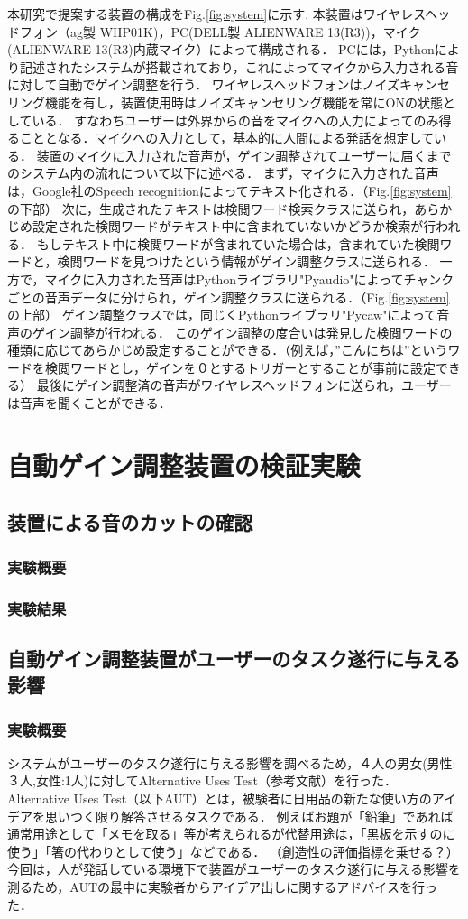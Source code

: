 \documentclass[a4paper]{jarticle}
\begin{document}
本研究で提案する装置の構成をFig.\ref{fig:system}に示す.
本装置はワイヤレスヘッドフォン（ag製 WHP01K)，PC(DELL製 ALIENWARE 13(R3))，マイク(ALIENWARE 13(R3)内蔵マイク）によって構成される．
PCには，Pythonにより記述されたシステムが搭載されており，これによってマイクから入力される音に対して自動でゲイン調整を行う．
ワイヤレスヘッドフォンはノイズキャンセリング機能を有し，装置使用時はノイズキャンセリング機能を常にONの状態としている．
すなわちユーザーは外界からの音をマイクへの入力によってのみ得ることとなる．マイクへの入力として，基本的に人間による発話を想定している．
装置のマイクに入力された音声が，ゲイン調整されてユーザーに届くまでのシステム内の流れについて以下に述べる．
まず，マイクに入力された音声は，Google社のSpeech recognitionによってテキスト化される．（Fig.\ref{fig:system}の下部）
次に，生成されたテキストは検閲ワード検索クラスに送られ，あらかじめ設定された検閲ワードがテキスト中に含まれていないかどうか検索が行われる．
もしテキスト中に検閲ワードが含まれていた場合は，含まれていた検閲ワードと，検閲ワードを見つけたという情報がゲイン調整クラスに送られる．
一方で，マイクに入力された音声はPythonライブラリ"Pyaudio"によってチャンクごとの音声データに分けられ，ゲイン調整クラスに送られる．（Fig.\ref{fig:system}の上部）
ゲイン調整クラスでは，同じくPythonライブラリ"Pycaw"によって音声のゲイン調整が行われる．
このゲイン調整の度合いは発見した検閲ワードの種類に応じてあらかじめ設定することができる．（例えば，”こんにちは”というワードを検閲ワードとし，ゲインを０とするトリガーとすることが事前に設定できる）
最後にゲイン調整済の音声がワイヤレスヘッドフォンに送られ，ユーザーは音声を聞くことができる．
\section{自動ゲイン調整装置の検証実験}
\subsection{装置による音のカットの確認}
\subsubsection{実験概要}
\subsubsection{実験結果}
\subsection{自動ゲイン調整装置がユーザーのタスク遂行に与える影響}
\subsubsection{実験概要}
システムがユーザーのタスク遂行に与える影響を調べるため，４人の男女(男性:３人,女性:1人)に対してAlternative Uses Test（参考文献）を行った．
Alternative Uses Test（以下AUT）とは，被験者に日用品の新たな使い方のアイデアを思いつく限り解答させるタスクである．
例えばお題が「鉛筆」であれば通常用途として「メモを取る」等が考えられるが代替用途は，「黒板を示すのに使う」「箸の代わりとして使う」などである．
（創造性の評価指標を乗せる？）
今回は，人が発話している環境下で装置がユーザーのタスク遂行に与える影響を測るため，AUTの最中に実験者からアイデア出しに関するアドバイスを行った．
\end{document}
